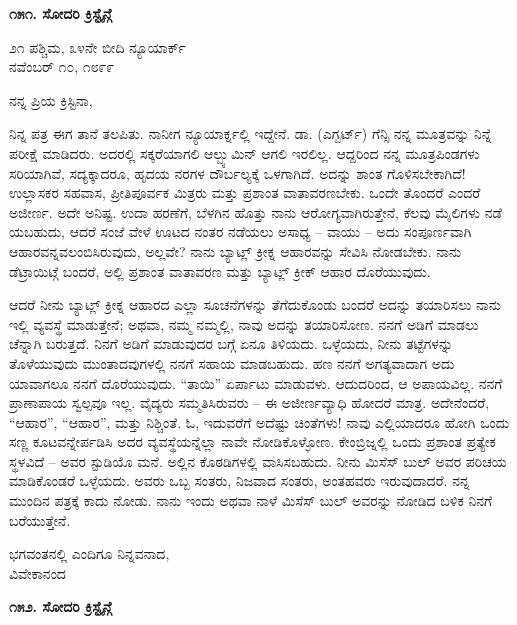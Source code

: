 \begin{center}
\textbf{೧೫೧. ಸೋದರಿ ಕ್ರಿಸ್ಟೈನ್ಗೆ}
\end{center}

\begin{flushright}
೨೧ ಪಶ್ಚಿಮ, ೩೪ನೇ ಬೀದಿ ನ್ಯೂಯಾರ್ಕ್\\ನವೆಂಬರ್ ೧೦, ೧೮೯೯
\end{flushright}

ನನ್ನ ಪ್ರಿಯ ಕ್ರಿಸ್ಟಿನಾ,

ನಿನ್ನ ಪತ್ರ ಈಗ ತಾನೆ ತಲಪಿತು. ನಾನೀಗ ನ್ಯೂಯಾರ್ಕ್ನಲ್ಲಿ ಇದ್ದೇನೆ. ಡಾ. (ಎಗ್ಬರ್ಟ್) ಗೆನ್ಸಿ ನನ್ನ ಮೂತ್ರವನ್ನು ನಿನ್ನೆ ಪರೀಕ್ಷೆ ಮಾಡಿದರು. ಅದರಲ್ಲಿ ಸಕ್ಕರೆಯಾಗಲಿ ಆಲ್ಬ್ಯುಮಿನ್ ಆಗಲಿ ಇರಲಿಲ್ಲ. ಆದ್ದರಿಂದ ನನ್ನ ಮೂತ್ರಪಿಂಡಗಳು ಸರಿಯಾಗಿವೆ, ಸದ್ಯಕ್ಕಾದರೂ, ಹೃದಯ ನರಗಳ ದೌರ್ಬಲ್ಯಕ್ಕೆ ಒಳಗಾಗಿದೆ. ಅದನ್ನು ಶಾಂತ ಗೊಳಿಸಬೇಕಾಗಿದೆ! ಉಲ್ಲಾಸಕರ ಸಹವಾಸ, ಪ್ರೀತಿಪೂರ್ವಕ ಮಿತ್ರರು ಮತ್ತು ಪ್ರಶಾಂತ ವಾತಾವರಣಬೇಕು. ಒಂದೇ ತೊಂದರೆ ಎಂದರೆ ಅಜೀರ್ಣ. ಅದೇ ಅನಿಷ್ಟ. ಉದಾ ಹರಣೆಗೆ, ಬೆಳಗಿನ ಹೊತ್ತು ನಾನು ಆರೋಗ್ಯವಾಗಿರುತ್ತೇನೆ, ಕೆಲವು ಮೈಲಿಗಳು ನಡೆ ಯಬಹುದು, ಆದರೆ ಸಂಜೆ ವೇಳೆ ಊಟದ ನಂತರ ನಡೆಯಲು ಅಸಾಧ್ಯ – ವಾಯು – ಅದು ಸಂಪೂರ್ಣವಾಗಿ ಆಹಾರವನ್ನವಲಂಬಿಸಿರುವುದು, ಅಲ್ಲವೇ? ನಾನು ಬ್ಯಾಟ್ಲ್ ಕ್ರೀಕ್ನ ಆಹಾರವನ್ನು ಸೇವಿಸಿ ನೋಡಬೇಕು. ನಾನು ಡೆಟ್ರಾಯಿಟ್ಗೆ ಬಂದರೆ, ಅಲ್ಲಿ ಪ್ರಶಾಂತ ವಾತಾವರಣ ಮತ್ತು ಬ್ಯಾಟ್ಲ್ ಕ್ರೀಕ್ ಆಹಾರ ದೊರೆಯುವುದು.

ಆದರೆ ನೀನು ಬ್ಯಾಟ್ಲ್ ಕ್ರೀಕ್ನ ಆಹಾರದ ಎಲ್ಲಾ ಸೂಚನೆಗಳನ್ನು ತೆಗೆದುಕೊಂಡು ಬಂದರೆ ಅದನ್ನು ತಯಾರಿಸಲು ನಾನು ಇಲ್ಲಿ ವ್ಯವಸ್ಥೆ ಮಾಡುತ್ತೇನೆ; ಅಥವಾ, ನಮ್ಮ ನಮ್ಮಲ್ಲಿ, ನಾವು ಅದನ್ನು ತಯಾರಿಸೋಣ. ನನಗೆ ಅಡಿಗೆ ಮಾಡಲು ಚೆನ್ನಾಗಿ ಬರುತ್ತದೆ. ನಿನಗೆ ಅಡಿಗೆ ಮಾಡುವುದರ ಬಗ್ಗೆ ಏನೂ ತಿಳಿಯದು. ಒಳ್ಳೆಯದು, ನೀನು ತಟ್ಟೆಗಳನ್ನು ತೊಳೆಯುವುದು ಮುಂತಾದವುಗಳಲ್ಲಿ ನನಗೆ ಸಹಾಯ ಮಾಡಬಹುದು. ಹಣ ನನಗೆ ಅಗತ್ಯವಾದಾಗ ಅದು ಯಾವಾಗಲೂ ನನಗೆ ದೊರೆಯುವುದು. “ತಾಯಿ” ಏರ್ಪಾಟು ಮಾಡುವಳು. ಆದುದರಿಂದ, ಆ ಅಪಾಯವಿಲ್ಲ. ನನಗೆ ಪ್ರಾಣಾಪಾಯ ಸ್ವಲ್ಪವೂ ಇಲ್ಲ. ವೈದ್ಯರು ಸಮ್ಮತಿಸಿರುವರು – ಈ ಅಜೀರ್ಣವ್ಯಾಧಿ ಹೋದರೆ ಮಾತ್ರ. ಅದೇನೆಂದರೆ, “ಆಹಾರ”, “ಆಹಾರ”, ಮತ್ತು ನಿಶ್ಚಿಂತೆ. ಓ, ಇದುವರೆಗೆ ಅದೆಷ್ಟು ಚಿಂತೆಗಳು! ನಾವು ಎಲ್ಲಿಯಾದರೂ ಹೋಗಿ ಒಂದು ಸಣ್ಣ ಕೂಟವನ್ನೇರ್ಪಡಿಸಿ ಅದರ ವ್ಯವಸ್ಥೆಯನ್ನೆಲ್ಲಾ ನಾವೇ ನೋಡಿಕೊಳ್ಳೋಣ. ಕೇಂಬ್ರಿಜ್ನಲ್ಲಿ ಒಂದು ಪ್ರಶಾಂತ ಪ್ರತ್ಯೇಕ ಸ್ಥಳವಿದೆ – ಅವರ ಸ್ಟುಡಿಯೊ ಮನೆ. ಅಲ್ಲಿನ ಕೊಠಡಿಗಳಲ್ಲಿ ವಾಸಿಸಬಹುದು. ನೀನು ಮಿಸೆಸ್ ಬುಲ್ ಅವರ ಪರಿಚಯ ಮಾಡಿಕೊಂಡರೆ ಒಳ್ಳೆಯದು. ಅವರು ಒಬ್ಬ ಸಂತರು, ನಿಜವಾದ ಸಂತರು, ಅಂತಹವರು ಇರುವುದಾದರೆ. ನನ್ನ ಮುಂದಿನ ಪತ್ರಕ್ಕೆ ಕಾದು ನೋಡು. ನಾನು ಇಂದು ಅಥವಾ ನಾಳೆ ಮಿಸೆಸ್ ಬುಲ್ ಅವರನ್ನು ನೋಡಿದ ಬಳಿಕ ನಿನಗೆ ಬರೆಯುತ್ತೇನೆ.

\begin{flushright}
ಭಗವಂತನಲ್ಲಿ ಎಂದಿಗೂ ನಿನ್ನವನಾದ,\\ವಿವೇಕಾನಂದ
\end{flushright}

\begin{center}
\textbf{೧೫೨. ಸೋದರಿ ಕ್ರಿಸ್ಟೈನ್ಗೆ}
\end{center}


